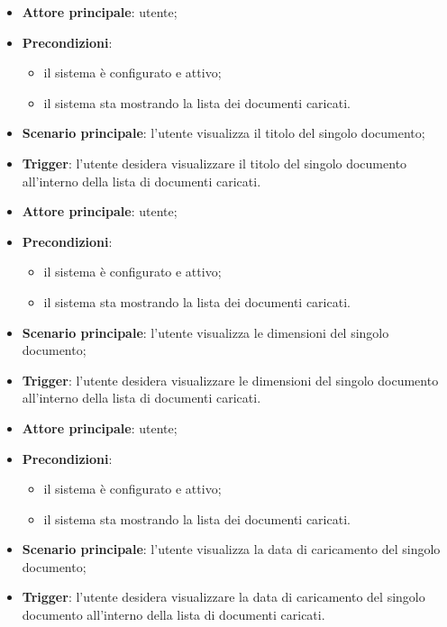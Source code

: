 \documentclass[10pt, a4paper]{article}
\begin{document}
    \begin{itemize}
        \item \textbf{Attore principale}: utente;
        \item \textbf{Precondizioni}:
            \begin{itemize}
                \item il sistema è configurato e attivo;
                \item il sistema sta mostrando la lista dei documenti caricati.
            \end{itemize}
        \item \textbf{Scenario principale}: l'utente visualizza il titolo del singolo documento;
        \item \textbf{Trigger}: l’utente desidera visualizzare il titolo del singolo documento all’interno della lista di documenti caricati.
    \end{itemize}

    \begin{itemize}
        \item \textbf{Attore principale}: utente;
        \item \textbf{Precondizioni}:
            \begin{itemize}
                \item il sistema è configurato e attivo;
                \item il sistema sta mostrando la lista dei documenti caricati.
            \end{itemize}
        \item \textbf{Scenario principale}: l'utente visualizza le dimensioni del singolo documento;
        \item \textbf{Trigger}: l’utente desidera visualizzare le dimensioni del singolo documento all’interno della lista di documenti caricati.
    \end{itemize}

    \begin{itemize}
        \item \textbf{Attore principale}: utente;
        \item \textbf{Precondizioni}:
            \begin{itemize}
                \item il sistema è configurato e attivo;
                \item il sistema sta mostrando la lista dei documenti caricati.
            \end{itemize}
        \item \textbf{Scenario principale}: l'utente visualizza la data di caricamento del singolo documento;
        \item \textbf{Trigger}: l’utente desidera visualizzare la data di caricamento del singolo documento all’interno della lista di documenti caricati.
    \end{itemize}
\end{document}
